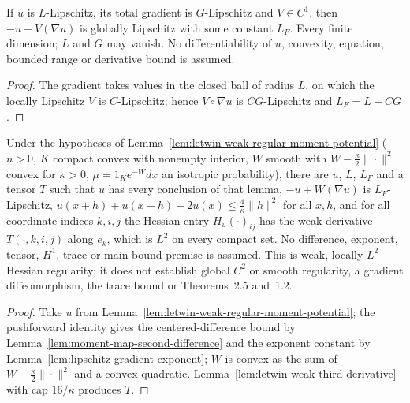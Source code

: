 \begin{lemma}
  \label{lem:lipschitz-gradient-exponent}
  \leanok
  If $u$ is $L$-Lipschitz, its total gradient is $G$-Lipschitz and $V\in C^1$, then $-u+V(\nabla u)$ is globally Lipschitz
  with some constant $L_F$. Every finite dimension; $L$ and $G$ may vanish. No differentiability of $u$, convexity, equation,
  bounded range or derivative bound is assumed.
\end{lemma}
\begin{proof}
  \leanok
  The gradient takes values in the closed ball of radius $L$, on which the locally Lipschitz $V$ is $C$-Lipschitz; hence
  $V\circ\nabla u$ is $CG$-Lipschitz and $L_F=L+CG$.
\end{proof}

\begin{lemma}
  \label{lem:letwin-regular-moment-weak-tensor}
  \leanok
  Under the hypotheses of Lemma~\ref{lem:letwin-weak-regular-moment-potential} ($n>0$, $K$ compact convex with nonempty
  interior, $W$ smooth with $W-\frac\kappa2\|\cdot\|^2$ convex for $\kappa>0$, $\mu=1_Ke^{-W}dx$ an isotropic probability),
  there are $u$, $L$, $L_F$ and a tensor $T$ such that $u$ has every conclusion of that lemma, $-u+W(\nabla u)$ is
  $L_F$-Lipschitz, $u(x+h)+u(x-h)-2u(x)\le\frac4\kappa\|h\|^2$ for all $x,h$, and for all coordinate indices $k,i,j$ the
  Hessian entry $H_u(\cdot)_{ij}$ has the weak derivative $T(\cdot,k,i,j)$ along $e_k$, which is $L^2$ on every compact set.
  No difference, exponent, tensor, $H^1$, trace or main-bound premise is assumed. This is weak, locally $L^2$ Hessian
  regularity; it does not establish global $C^2$ or smooth regularity, a gradient diffeomorphism, the trace bound or
  Theorems~2.5 and~1.2.
\end{lemma}
\begin{proof}
  \leanok
  Take $u$ from Lemma~\ref{lem:letwin-weak-regular-moment-potential}; the pushforward identity gives the centered-difference
  bound by Lemma~\ref{lem:moment-map-second-difference} and the exponent constant by
  Lemma~\ref{lem:lipschitz-gradient-exponent}; $W$ is convex as the sum of $W-\frac\kappa2\|\cdot\|^2$ and a convex quadratic.
  Lemma~\ref{lem:letwin-weak-third-derivative} with cap $16/\kappa$ produces $T$.
\end{proof}

